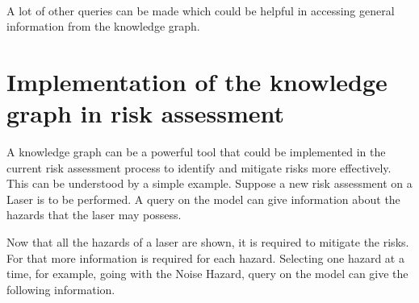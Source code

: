 
\bigskip\bigskip {}

\paragraph{} A lot of other queries can be made which could be helpful in accessing general information from the knowledge graph.

\section{Implementation of the knowledge graph in risk assessment}
A knowledge graph can be a powerful tool that could be implemented in the current risk assessment process to identify and mitigate risks more effectively. This can be understood by a simple example. Suppose a new risk assessment on a Laser is to be performed. A query on the model can give information about the hazards that the laser may possess.


\bigskip\bigskip {}

Now that all the hazards of a laser are shown, it is required to mitigate the risks. For that more information is required for each hazard. Selecting one hazard at a time, for example, going with the Noise Hazard, query on the model can give the following information.


\bigskip\bigskip {}

